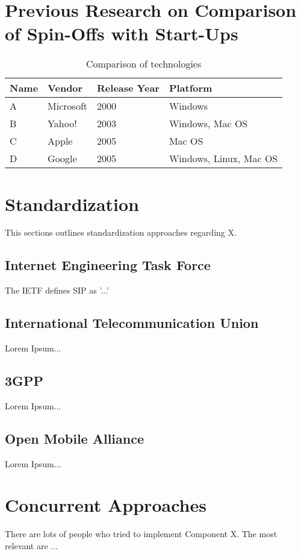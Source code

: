 \section{Previous Research on Comparison of Spin-Offs with Start-Ups\label{sec:previous_r_comparison}}





\begin{table}[htb]
\centering
\begin{tabular}[t]{|l|l|l|l|}
\hline
Name & Vendor & Release Year & Platform \\
\hline
\hline
A & Microsoft & 2000 & Windows \\
\hline
B & Yahoo! & 2003 & Windows, Mac OS \\
\hline
C & Apple & 2005 & Mac OS \\
\hline
D & Google & 2005 & Windows, Linux, Mac OS \\
\hline
\end{tabular}
\caption{Comparison of technologies}
\label{tab:enghistory}
\end{table}

\section{Standardization \label{sec:standard}}

This sections outlines standardization approaches regarding X.

\subsection{Internet Engineering Task Force\label{sec:itu}}

The IETF defines SIP as '...' \cite{rfcsip}

\subsection{International Telecommunication Union\label{sec:itu}}

Lorem Ipsum...

\subsection{3GPP\label{sec:3gpp}}

Lorem Ipsum...

\subsection{Open Mobile Alliance\label{sec:oma}}

Lorem Ipsum...

\section{Concurrent Approaches \label{sec:summ}}

There are lots of people who tried to implement Component X. The most relevant are ...